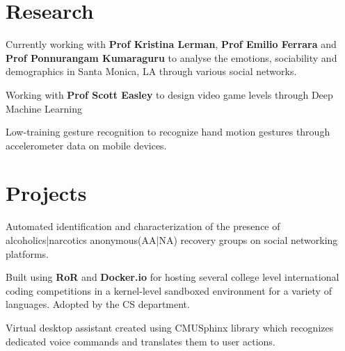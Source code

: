 \documentclass[]{deedy-resume-openfont}
\begin{document}
\begin{minipage}[t]{0.66\textwidth}


\section{Research}
Currently working with \textbf{Prof Kristina Lerman}, \textbf{Prof Emilio Ferrara} and \textbf{Prof Ponnurangam Kumaraguru} to analyse the emotions, sociability and demographics in Santa Monica, LA through various social networks.
\sectionsep

Working with \textbf{Prof Scott Easley} to design video game levels through Deep Machine Learning
\sectionsep


Low-training gesture recognition to recognize hand motion gestures through accelerometer data on mobile devices.

\section{Projects}
Automated identification and characterization of the presence of alcoholics|narcotics anonymous(AA|NA) recovery groups on social networking platforms.
\sectionsep

Built using \textbf{RoR} and \textbf{Docker.io} for hosting several college level international coding competitions in a kernel-level sandboxed environment for a variety of languages. Adopted by the CS department.
\sectionsep

Virtual desktop assistant created using CMUSphinx library which recognizes dedicated voice commands and translates them to user actions.
\sectionsep




\end{minipage}
\end{document}
